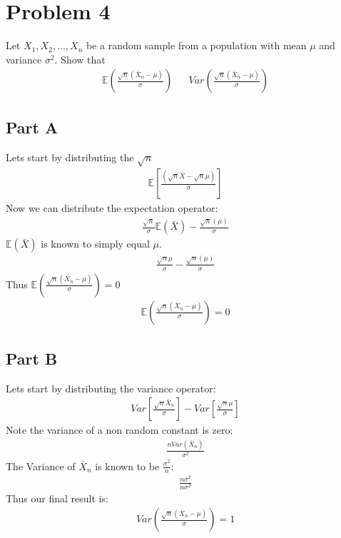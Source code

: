 \documentclass{article}
\begin{document}
\clearpage

\section*{Problem 4}
Let $X_1, X_2,..., X_n$ be a random sample from a population with mean $\mu$ and variance $\sigma^2$. Show that
\begin{align*}
\mathbb{E}(\frac{\sqrt{n}(\bar{X}_n - \mu)}{\sigma}) && Var(\frac{\sqrt{n}(\bar{X}_n - \mu)}{\sigma})
\end{align*}
\subsection*{Part A}
Lets start by distributing the $\sqrt{n}$
\begin{align*}
\mathbb{E}[\frac{(\sqrt{n}\bar{X} - \sqrt{n}\mu)}{\sigma}]
\end{align*}
Now we can distribute the expectation operator:
\begin{align*}
\frac{\sqrt{n}}{\sigma} \mathbb{E}(\bar{X}) - \frac{\sqrt{n}(\mu)}{\sigma} 
\end{align*}
$\mathbb{E}(\bar{X})$ is known to simply equal $\mu$.
\begin{align*}
\frac{\sqrt{n}\mu}{\sigma} - \frac{\sqrt{n}(\mu)}{\sigma} 
\end{align*}
Thus $\mathbb{E}(\frac{\sqrt{n}(\bar{X}_n - \mu)}{\sigma}) = 0$
\begin{align*}
\boxed{ \mathbb{E}(\frac{\sqrt{n}(\bar{X}_n - \mu)}{\sigma}) = 0 }
\end{align*}
\subsection*{Part B}
Lets start by distributing the variance operator:
\begin{align*}
Var[\frac{\sqrt{n}\bar{X}_n}{\sigma}] - Var[\frac{\sqrt{n}\mu}{\sigma}]
\end{align*}
Note the variance of a non random constant is zero:
\begin{align*}
\frac{nVar(\bar{X}_n)}{\sigma^2}
\end{align*}
The Variance of $\bar{X}_n$ is known to be $\tfrac{\sigma^2}{n}$:
\begin{align*}
\frac{n \sigma^2}{n \sigma^2}
\end{align*}
Thus our final result is:
\begin{align*}
\boxed{ Var(\frac{\sqrt{n}(\bar{X}_n - \mu)}{\sigma}) = 1 }
\end{align*}
\clearpage
\end{document}
